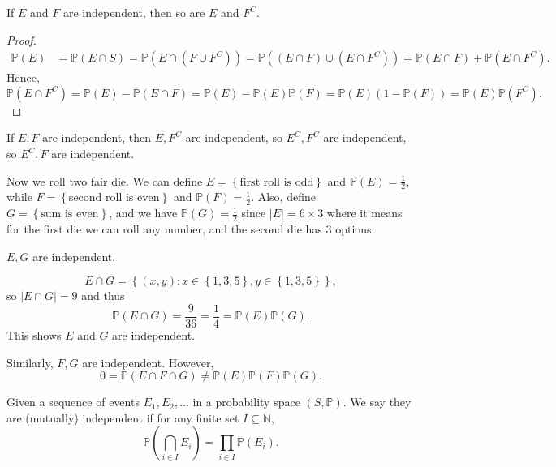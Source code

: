 \begin{proposition}
    If \(E\) and \(F\) are independent, then so are \(E\) and \(F^C\).    
\end{proposition}
\begin{proof}
    \begin{align*}
        \mathbb{P} (E) &= \mathbb{P} (E \cap S) = \mathbb{P} (E \cap (F \cup F^C)) = \mathbb{P}((E \cap F) \cup (E \cap F^C)) = \mathbb{P} (E \cap F) + \mathbb{P} (E \cap F^C). 
    \end{align*}
    Hence,
    \[
        \mathbb{P} (E \cap F^C) = \mathbb{P} (E) - \mathbb{P} (E \cap F) = \mathbb{P} (E) - \mathbb{P} (E) \mathbb{P} (F) = \mathbb{P} (E) (1 - \mathbb{P} (F)) = \mathbb{P} (E) \mathbb{P} (F^C).
    \]
\end{proof}

\begin{corollary}
    If \(E, F\) are independent, then \(E, F^C\) are independent, so \(E^C, F^C\) are independent, so \(E^C, F\) are independent.    
\end{corollary}

\begin{eg}
    Now we roll two fair die. We can define \(E = \left\{ \text{first roll is odd}  \right\} \) and \(\mathbb{P} (E) = \frac{1}{2}\), while \(F = \left\{ \text{second roll is even}  \right\} \) and \(\mathbb{P} (F) = \frac{1}{2}\). Also, define \(G = \left\{ \text{sum is even}  \right\} \), and we have \(\mathbb{P} (G) = \frac{1}{2}\) since \(\vert E \vert = 6 \times 3\) where it means for the first die we can roll any number, and the second die has \(3\) options.
    \begin{claim}
        \(E, G\) are independent. 
    \end{claim}    
    \begin{explanation}
        \[
            E \cap G = \left\{ (x, y): x \in \left\{ 1, 3, 5 \right\}, y \in \left\{ 1, 3, 5 \right\}   \right\}, 
        \]
        so \(\vert E \cap G \vert = 9\) and thus 
        \[
            \mathbb{P} (E \cap G) = \frac{9}{36} = \frac{1}{4} = \mathbb{P} (E) \mathbb{P} (G).
        \]
        This shows \(E\) and \(G\) are independent.   
    \end{explanation}
    Similarly, \(F, G\) are independent. However,
    \[
        0 = \mathbb{P} (E \cap F \cap G) \neq \mathbb{P} (E) \mathbb{P} (F) \mathbb{P} (G).
    \] 
\end{eg}

\begin{definition}
    Given a sequence of events \(E_1, E_2, \dots \) in a probability space \((S, \mathbb{P} )\). We say they are (mutually) independent if for any finite set \(I \subseteq \mathbb{N} \),
    \[
        \mathbb{P} \left( \bigcap_{i \in I} E_i  \right) = \prod_{i \in I} \mathbb{P} (E_i). 
    \]   
\end{definition}

